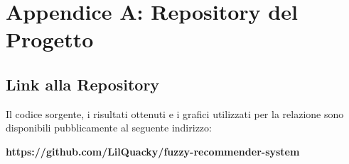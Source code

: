 \chapter{Appendice A: Repository del Progetto}
\label{chap:app2}

\section{Link alla Repository}

Il codice sorgente, i risultati ottenuti e i grafici utilizzati per la relazione sono disponibili pubblicamente al seguente indirizzo:

\begin{center}
\textbf{https://github.com/LilQuacky/fuzzy-recommender-system}
\end{center}
